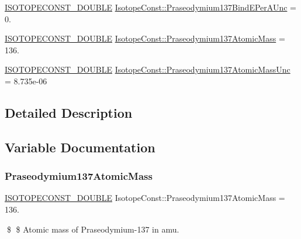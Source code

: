 \begin{DoxyCompactItemize}
\item 
\mbox{\hyperlink{group___isotope_const-_macros_ga8f45a7272ce02c0b4c65c44636ed719a}{I\+S\+O\+T\+O\+P\+E\+C\+O\+N\+S\+T\+\_\+\+D\+O\+U\+B\+LE}} \mbox{\hyperlink{group___isotope_const-_praseodymium-_pr137_ga73fa1c7e1553b4e090f7ede9af1d3e2e}{Isotope\+Const\+::\+Praseodymium137\+Bind\+E\+Per\+A\+Unc}} = 0.
\item 
\mbox{\hyperlink{group___isotope_const-_macros_ga8f45a7272ce02c0b4c65c44636ed719a}{I\+S\+O\+T\+O\+P\+E\+C\+O\+N\+S\+T\+\_\+\+D\+O\+U\+B\+LE}} \mbox{\hyperlink{group___isotope_const-_praseodymium-_pr137_ga3540a111ea889c0b93dcf6dd79ba9fa5}{Isotope\+Const\+::\+Praseodymium137\+Atomic\+Mass}} = 136.
\item 
\mbox{\hyperlink{group___isotope_const-_macros_ga8f45a7272ce02c0b4c65c44636ed719a}{I\+S\+O\+T\+O\+P\+E\+C\+O\+N\+S\+T\+\_\+\+D\+O\+U\+B\+LE}} \mbox{\hyperlink{group___isotope_const-_praseodymium-_pr137_ga94c5aad3d5b9e8e8ef61972aa18432e1}{Isotope\+Const\+::\+Praseodymium137\+Atomic\+Mass\+Unc}} = 8.\+735e-\/06
\end{DoxyCompactItemize}


\subsection{Detailed Description}


\subsection{Variable Documentation}
\mbox{\label{group___isotope_const-_praseodymium-_pr137_ga3540a111ea889c0b93dcf6dd79ba9fa5}} 
\subsubsection{\texorpdfstring{Praseodymium137\+Atomic\+Mass}{Praseodymium137AtomicMass}}
{\footnotesize\ttfamily \mbox{\hyperlink{group___isotope_const-_macros_ga8f45a7272ce02c0b4c65c44636ed719a}{I\+S\+O\+T\+O\+P\+E\+C\+O\+N\+S\+T\+\_\+\+D\+O\+U\+B\+LE}} Isotope\+Const\+::\+Praseodymium137\+Atomic\+Mass = 136.}

\$ \$ Atomic mass of Praseodymium-\/137 in amu. \mbox{\label{group___isotope_const-_praseodymium-_pr137_ga94c5aad3d5b9e8e8ef61972aa18432e1}} 
